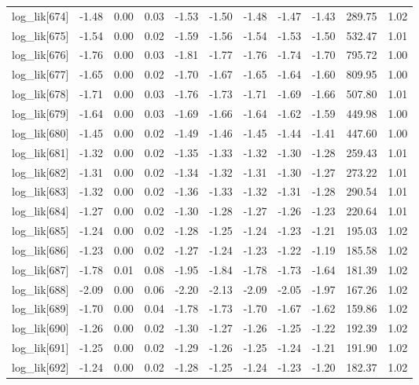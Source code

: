 \begin{table}[ht]
\begin{tabular}{rrrrrrrrrrr}
  log\_lik[674] & -1.48 & 0.00 & 0.03 & -1.53 & -1.50 & -1.48 & -1.47 & -1.43 & 289.75 & 1.02 \\ 
  log\_lik[675] & -1.54 & 0.00 & 0.02 & -1.59 & -1.56 & -1.54 & -1.53 & -1.50 & 532.47 & 1.01 \\ 
  log\_lik[676] & -1.76 & 0.00 & 0.03 & -1.81 & -1.77 & -1.76 & -1.74 & -1.70 & 795.72 & 1.00 \\ 
  log\_lik[677] & -1.65 & 0.00 & 0.02 & -1.70 & -1.67 & -1.65 & -1.64 & -1.60 & 809.95 & 1.00 \\ 
  log\_lik[678] & -1.71 & 0.00 & 0.03 & -1.76 & -1.73 & -1.71 & -1.69 & -1.66 & 507.80 & 1.01 \\ 
  log\_lik[679] & -1.64 & 0.00 & 0.03 & -1.69 & -1.66 & -1.64 & -1.62 & -1.59 & 449.98 & 1.00 \\ 
  log\_lik[680] & -1.45 & 0.00 & 0.02 & -1.49 & -1.46 & -1.45 & -1.44 & -1.41 & 447.60 & 1.00 \\ 
  log\_lik[681] & -1.32 & 0.00 & 0.02 & -1.35 & -1.33 & -1.32 & -1.30 & -1.28 & 259.43 & 1.01 \\ 
  log\_lik[682] & -1.31 & 0.00 & 0.02 & -1.34 & -1.32 & -1.31 & -1.30 & -1.27 & 273.22 & 1.01 \\ 
  log\_lik[683] & -1.32 & 0.00 & 0.02 & -1.36 & -1.33 & -1.32 & -1.31 & -1.28 & 290.54 & 1.01 \\ 
  log\_lik[684] & -1.27 & 0.00 & 0.02 & -1.30 & -1.28 & -1.27 & -1.26 & -1.23 & 220.64 & 1.01 \\ 
  log\_lik[685] & -1.24 & 0.00 & 0.02 & -1.28 & -1.25 & -1.24 & -1.23 & -1.21 & 195.03 & 1.02 \\ 
  log\_lik[686] & -1.23 & 0.00 & 0.02 & -1.27 & -1.24 & -1.23 & -1.22 & -1.19 & 185.58 & 1.02 \\ 
  log\_lik[687] & -1.78 & 0.01 & 0.08 & -1.95 & -1.84 & -1.78 & -1.73 & -1.64 & 181.39 & 1.02 \\ 
  log\_lik[688] & -2.09 & 0.00 & 0.06 & -2.20 & -2.13 & -2.09 & -2.05 & -1.97 & 167.26 & 1.02 \\ 
  log\_lik[689] & -1.70 & 0.00 & 0.04 & -1.78 & -1.73 & -1.70 & -1.67 & -1.62 & 159.86 & 1.02 \\ 
  log\_lik[690] & -1.26 & 0.00 & 0.02 & -1.30 & -1.27 & -1.26 & -1.25 & -1.22 & 192.39 & 1.02 \\ 
  log\_lik[691] & -1.25 & 0.00 & 0.02 & -1.29 & -1.26 & -1.25 & -1.24 & -1.21 & 191.90 & 1.02 \\ 
  log\_lik[692] & -1.24 & 0.00 & 0.02 & -1.28 & -1.25 & -1.24 & -1.23 & -1.20 & 182.37 & 1.02 \\ 

\end{tabular}
\end{table}
